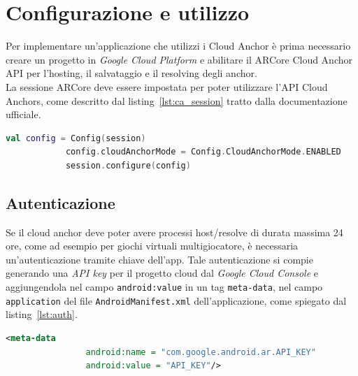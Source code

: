 \documentclass[crop=false, class=book]{standalone}
\begin{document}
	\section{Configurazione e utilizzo}
	Per implementare un'applicazione che utilizzi i Cloud Anchor è prima necessario creare un progetto in \textit{Google Cloud Platform} e abilitare il ARCore Cloud Anchor API per l'hosting, il salvataggio e il resolving degli anchor.
	\\
	\noindent
	La sessione ARCore deve essere impostata per poter utilizzare l'API Cloud Anchors, come descritto dal listing~\vref{lst:ca_session} tratto dalla documentazione ufficiale.
	\begin{center}
		\begin{minipage}{0.95\textwidth}
			\begin{lstlisting}[caption={Configurazione della modalità Cloud Anchor.}, label={lst:ca_session}, language=Kotlin]
			val config = Config(session)
			config.cloudAnchorMode = Config.CloudAnchorMode.ENABLED
			session.configure(config)
			\end{lstlisting}
		\end{minipage}
	\end{center}

	\subsection{Autenticazione}
	\label{subsec:auth}
	Se il cloud anchor deve poter avere processi host/resolve di durata massima 24 ore, come ad esempio per giochi virtuali multigiocatore, è necessaria un'autenticazione tramite chiave dell'app. Tale autenticazione si compie generando una \textit{API key} per il progetto cloud dal \textit{Google Cloud Console} e aggiungendola nel campo \verb|android:value| in un tag \verb|meta-data|, nel campo \verb|application| del file \verb|AndroidManifest.xml| dell'applicazione, come spiegato dal listing~\vref{lst:auth}.
	\begin{center}
		\begin{minipage}{0.95\textwidth}
			\begin{lstlisting}[caption={Autenticazione con API key.}, label={lst:auth}, language=xml, morekeywords={android:name, android:value}, keywordstyle={\color{NavyBlue}\bfseries}, alsodigit={-}, stringstyle={\color{ForestGreen}\ttfamily}, emph={meta-data},emphstyle={\color{OrangeRed}}]
			<meta-data
				android:name = "com.google.android.ar.API_KEY"
				android:value = "API_KEY"/>
			\end{lstlisting}
		\end{minipage}
	\end{center}
\end{document}
